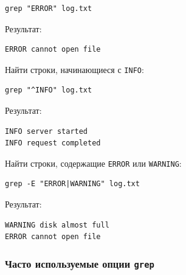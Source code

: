 \documentclass[12pt,a4paper]{article}
\begin{document}
\begin{verbatim}
grep "ERROR" log.txt
\end{verbatim}

Результат:

\begin{verbatim}
ERROR cannot open file
\end{verbatim}

Найти строки, начинающиеся с \texttt{INFO}:

\begin{verbatim}
grep "^INFO" log.txt
\end{verbatim}

Результат:

\begin{verbatim}
INFO server started
INFO request completed
\end{verbatim}

Найти строки, содержащие \texttt{ERROR} или \texttt{WARNING}:

\begin{verbatim}
grep -E "ERROR|WARNING" log.txt
\end{verbatim}

Результат:

\begin{verbatim}
WARNING disk almost full
ERROR cannot open file
\end{verbatim}

\subsubsection{Часто используемые опции \texttt{grep}}
\end{document}
